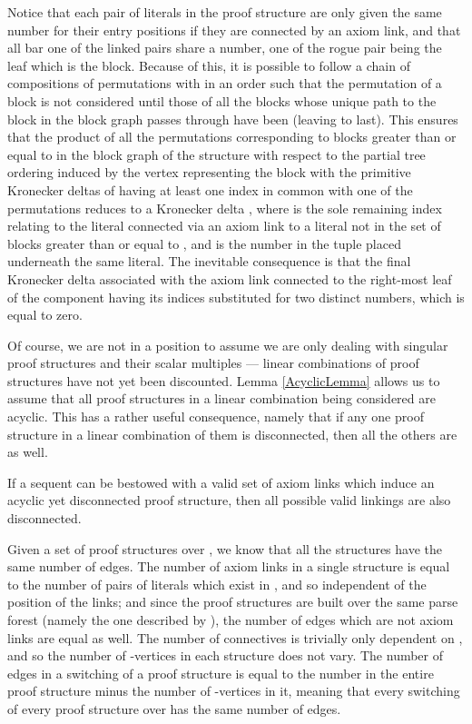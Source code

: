 \documentclass{LMCS}
\theoremstyle{plain}\newtheorem*{cLm}{Claim}
\newcommand{\p}{} \newcommand{\N}{\mathbb{N}}
\begin{document}
  Notice that each pair of literals in the proof structure are only given the same number for their entry positions if they are connected by an axiom link, and that all bar one of the linked pairs share a number, one of the rogue pair being the leaf which is the  block. Because of this, it is possible to follow a chain of compositions of permutations with  in an order such that the permutation of a block  is not considered until those of all the blocks whose unique path to the  block in the block graph passes through  have been (leaving  to last). This ensures that the product of all the permutations corresponding to blocks greater than or equal to  in the block graph of the structure with respect to the partial tree ordering induced by the vertex representing the  block with the primitive Kronecker deltas of  having at least one index in common with one of the permutations reduces to a Kronecker delta , where  is the sole remaining index relating to the literal connected via an axiom link to a literal not in the set of blocks greater than or equal to , and  is the number in the tuple placed underneath the same literal. The inevitable consequence is that the final Kronecker delta associated with the axiom link connected to the right-most leaf of the component having its indices substituted for two distinct numbers, which is equal to zero.
  
  \p Of course, we are not in a position to assume we are only dealing with singular proof structures and their scalar multiples --- linear combinations of proof structures have not yet been discounted. Lemma \ref{AcyclicLemma} allows us to assume that all proof structures in a linear combination being considered are acyclic. This has a rather useful consequence, namely that if any one proof structure in a linear combination of them is disconnected, then all the others are as well.
  
  \begin{lem} \label{OneDiscThenAllClaim}
  If a sequent  can be bestowed with a valid set of axiom links which induce an acyclic yet disconnected proof structure, then all possible valid linkings are also disconnected.
  \end{lem}
  \proof
  Given a set of
  proof structures over , we know that all the structures have the same number
  of edges. The number of axiom links in a single structure is equal to the number of pairs of literals which exist in , and so independent of the position of the links; and since the proof structures are built over the same parse forest (namely the one described by ), the number of edges which are not axiom links are equal as well. The number of  connectives is trivially only dependent on , and so the number of -vertices in each structure does not vary. The number of edges in a switching of a proof structure is equal to the number in the entire proof structure minus the number of -vertices in it, meaning that every switching of every proof structure over  has the same number of edges.
  
\end{document}
